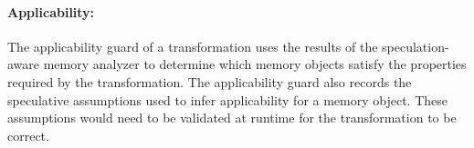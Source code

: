 %
%
%


%
\paragraph{Applicability:}
%
The applicability guard of a transformation uses the results of the
speculation-aware memory analyzer to determine which memory objects
satisfy the properties required by the transformation.
%
The applicability guard also records the speculative assumptions used
to infer applicability for a memory object. These assumptions would
need to be validated at runtime for the transformation to be correct.

